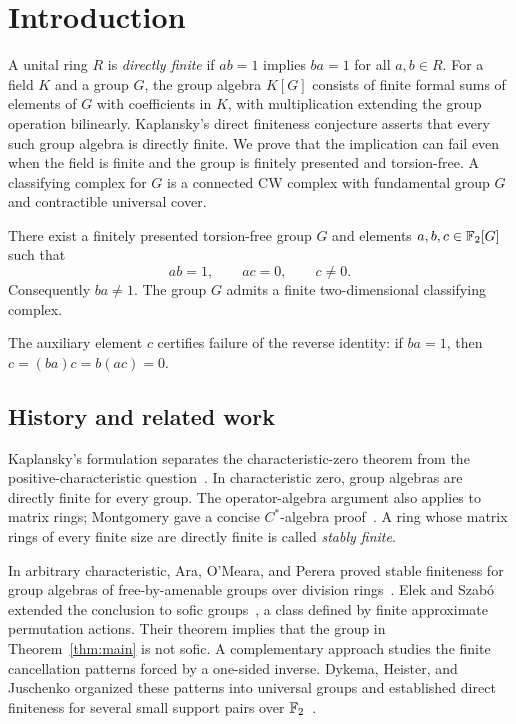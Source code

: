 \section{Introduction}\label{sec:introduction}

A unital ring $R$ is \emph{directly finite} if $ab=1$ implies $ba=1$ for all
$a,b\in R$. For a field $K$ and a group $G$, the group algebra $K[G]$ consists
of finite formal sums of elements of $G$ with coefficients in $K$, with
multiplication extending the group operation bilinearly. Kaplansky's direct
finiteness conjecture asserts that every such group algebra is directly finite.
We prove that the implication can fail even when the field is finite and the
group is finitely presented and torsion-free.
A classifying complex for $G$ is a connected CW complex with fundamental group
$G$ and contractible universal cover.

\begin{theorem}\label{thm:main}
There exist a finitely presented torsion-free group $G$ and elements
$a,b,c\in\mathbb F_2[G]$ such that
\[
 ab=1,\qquad ac=0,\qquad c\ne0.
\]
Consequently $ba\ne1$. The group $G$ admits a finite two-dimensional
classifying complex.
\end{theorem}

The auxiliary element $c$ certifies failure of the reverse identity:
if $ba=1$, then $c=(ba)c=b(ac)=0$.

\subsection*{History and related work}
Kaplansky's formulation separates the characteristic-zero theorem from the
positive-characteristic question~\cite[Part~II, Section~3, Problem~2,
pp.~122--123]{Kaplansky1972}. In characteristic zero, group algebras are directly
finite for every group. The operator-algebra argument also applies to matrix
rings; Montgomery gave a concise $C^*$-algebra proof~\cite{Montgomery1969}.
A ring whose matrix rings of every finite size are directly finite is called
\emph{stably finite}.

In arbitrary characteristic, Ara, O'Meara, and Perera proved stable finiteness
for group algebras of free-by-amenable groups over division
rings~\cite{AraOMearaPerera2002}. Elek and Szab\'o extended the conclusion to
sofic groups~\cite[Corollary~4.7]{ElekSzabo2004}, a class defined by finite
approximate permutation actions. Their theorem implies that the group in
Theorem~\ref{thm:main} is not sofic. A complementary approach studies the
finite cancellation patterns forced by a one-sided inverse. Dykema, Heister,
and Juschenko organized these patterns into universal groups and established
direct finiteness for several small support pairs over
$\mathbb F_2$~\cite{DykemaHeisterJuschenko2015}.

